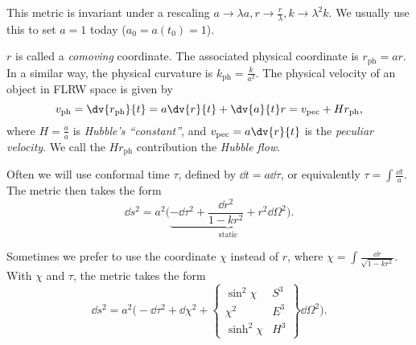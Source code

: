 \documentclass{jknotes}
\begin{document}
This metric is invariant under a rescaling \(a\to \lambda a, r\to \frac{r}{\lambda}, k\to \lambda^2 k\). We usually use this to set \(a=1\) today (\(a_0=a(t_0)=1\)).

\(r\) is called a \emph{comoving} coordinate. The associated physical coordinate is \(r_{\text{ph}}=ar\). In a similar way, the physical curvature is \(k_{\text{ph}}=\frac{k}{a^2}\). The physical velocity of an object in FLRW space is given by
\begin{equation}
    v_{\text{ph}} = \dv{r_{\text{ph}}}{t} = a\dv{r}{t} + \dv{a}{t}r = v_{\text{pec}} + Hr_{\text{ph}},
\end{equation}
where \(H=\frac{\dot{a}}{a}\) is \emph{Hubble's ``constant''}, and \(v_{\text{pec}}=a\dv{r}{t}\) is the \emph{peculiar velocity}. We call the \(Hr_{\text{ph}}\) contribution the \emph{Hubble flow}.

Often we will use conformal time \(\tau\), defined by \(\dd{t}=a\dd{\tau}\), or equivalently \(\tau = \int\frac{\dd{t}}{a}\). The metric then takes the form
\begin{equation}
    \dd{s}^2 = a^2\Big(\underbrace{-\dd{\tau}^2+\frac{\dd{r}^2}{1-kr^2}+r^2\dd{\Omega}^2}_{\text{static}}\Big).
\end{equation}

Sometimes we prefer to use the coordinate \(\chi\) instead of \(r\), where \(\chi = \int\frac{\dd{r}}{\sqrt{1-kr^2}}\). With \(\chi\) and \(\tau\), the metric takes the form
\begin{equation}
    \dd{s}^2 = a^2\Big(-\dd{\tau}^2 + \dd{\chi}^2 + 
        \begin{Bmatrix}
            \sin^2\chi & S^3 \\
            \chi^2 & E^3 \\
            \sinh^2\chi & H^3
        \end{Bmatrix}
    \dd{\Omega}^2\Big).
\end{equation}
\end{document}
